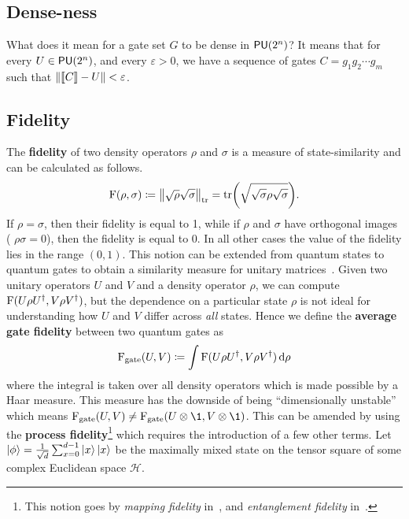 \subsection{Dense-ness}

What does it mean for a gate set $G$ to be dense in $\mathsf{PU} (2^n)$?
It means that for every $U \in \mathsf{PU} (2^n)$, and every $\varepsilon > 0$, we have a sequence of gates $C = g_1g_2\cdots g_m$ such that $\norm{\llbracket C\rrbracket - U} < \varepsilon$.

\subsection{Fidelity}

The \textbf{fidelity} of two density operators $\rho$ and $\sigma$ is a measure of state-similarity and can be calculated as follows.
\begin{equation}
    \operatorname{F}(\rho, \sigma) \coloneqq \norm{\sqrt{\rho}\sqrt{\sigma}}_\text{tr} = \tr(\sqrt{\sqrt{\sigma}\rho\sqrt{\sigma}}).
\end{equation}
If $\rho = \sigma$, then their fidelity is equal to 1, while if $\rho$ and $\sigma$ have orthogonal images (\ie{} $\rho\sigma = 0$), then the fidelity is equal to 0.
In all other cases the value of the fidelity lies in the range $(0, 1)$.
This notion can be extended from quantum states to quantum gates to obtain a
similarity measure for unitary matrices~\cite{fidelity}.
Given two unitary operators $U$ and $V$ and a density operator $\rho$, we can compute $\operatorname{F}(U\rho U^\dagger, V\rho V^\dagger)$, but the dependence on a particular state $\rho$ is not ideal for understanding how $U$ and $V$ differ across \emph{all} states.
Hence we define the \textbf{average gate fidelity} between two quantum gates as
\begin{equation}
    \operatorname{F}_\text{gate}(U, V) \coloneqq \int \operatorname{F}(U\rho U^\dagger, V\rho V^\dagger)\dd{\rho}
\end{equation}
where the integral is taken over all density operators which is made possible by a Haar measure.
This measure has the downside of being ``dimensionally unstable'' which means $\Fid_\text{gate}(U, V) \neq \Fid_\text{gate}(U\otimes \1, V\otimes \1)$.
This can be amended by using the \textbf{process fidelity}\footnote{This notion goes by \emph{mapping fidelity} in~\cite{watroustqi}, and \emph{entanglement fidelity} in~\cite{nielsenchuang}.} which requires the introduction of a few other terms.
Let $\ket{\phi} = \frac{1}{\sqrt{d}}\sum_{x = 0}^{d-1}\ket{x}\ket{x}$ be the maximally mixed state on the tensor square of some complex Euclidean space $\mathcal{H}$.
